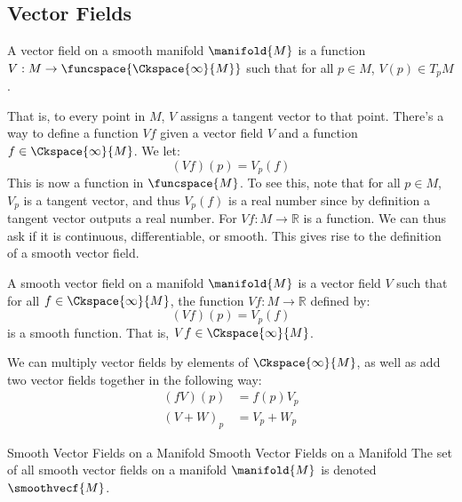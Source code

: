    \subsection{Vector Fields}
        \begin{definition}
            A vector field on a smooth manifold $\manifold{M}$ is a function
            $V:M\rightarrow\funcspace{\Ckspace{\infty}{M}}$ such that for
            all $p\in{M}$, $V(p)\in{T}_{p}M$.
        \end{definition}
        That is, to every point in $M$, $V$ assigns a tangent vector to that
        point. There's a way to define a function $Vf$ given a vector field
        $V$ and a function $f\in\Ckspace{\infty}{M}$. We let:
        \begin{equation}
            (Vf)(p)=V_{p}(f)
        \end{equation}
        This is now a function in $\funcspace{M}$. To see this, note that
        for all $p\in{M}$, $V_{p}$ is a tangent vector, and thus
        $V_{p}(f)$ is a real number since by definition a tangent vector
        outputs a real number. For $Vf:M\rightarrow\mathbb{R}$ is a
        function. We can thus ask if it is continuous, differentiable, or
        smooth. This gives rise to the definition of a smooth vector field.
        \begin{definition}
            A smooth vector field on a manifold $\manifold{M}$ is a vector
            field $V$ such that for all $f\in\Ckspace{\infty}{M}$, the
            function $Vf:M\rightarrow\mathbb{R}$ defined by:
            \begin{equation}
                (Vf)(p)=V_{p}(f)
            \end{equation}
            is a smooth function. That is, $Vf\in\Ckspace{\infty}{M}$.
        \end{definition}
        We can multiply vector fields by elements of $\Ckspace{\infty}{M}$,
        as well as add two vector fields together in the following way:
        \begin{align}
            (fV)(p)&=f(p)V_{p}\\
            (V+W)_{p}&=V_{p}+W_{p}
        \end{align}
        \begin{fnotation}{Smooth Vector Fields on a Manifold}
                         {Smooth Vector Fields on a Manifold}
            The set of all smooth vector fields on a manifold $\manifold{M}$
            is denoted $\smoothvecf{M}$.
        \end{fnotation}

